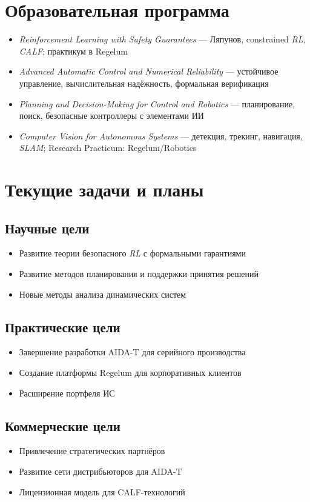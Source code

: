 \documentclass[12pt,a4paper]{article}
\begin{document}
\section{Образовательная программа}
\begin{itemize}
    \item \textit{Reinforcement Learning with Safety Guarantees} --- Ляпунов, constrained \textit{RL}, \textit{CALF}; практикум в Regelum
    \item \textit{Advanced Automatic Control and Numerical Reliability} --- устойчивое управление, вычислительная надёжность, формальная верификация
    \item \textit{Planning and Decision-Making for Control and Robotics} --- планирование, поиск, безопасные контроллеры с элементами ИИ
    \item \textit{Computer Vision for Autonomous Systems} --- детекция, трекинг, навигация, \textit{SLAM}; Research Practicum: Regelum/Robotics
\end{itemize}

\section{Текущие задачи и планы}
\subsection*{Научные цели}
\begin{itemize}
    \item Развитие теории безопасного \textit{RL} с формальными гарантиями
    \item Развитие методов планирования и поддержки принятия решений
    \item Новые методы анализа динамических систем
\end{itemize}

\subsection*{Практические цели}
\begin{itemize}
    \item Завершение разработки AIDA-T для серийного производства
    \item Создание платформы Regelum для корпоративных клиентов
    \item Расширение портфеля ИС
\end{itemize}

\subsection*{Коммерческие цели}
\begin{itemize}
    \item Привлечение стратегических партнёров
    \item Развитие сети дистрибьюторов для AIDA-T
    \item Лицензионная модель для CALF-технологий
\end{itemize}
\end{document}
